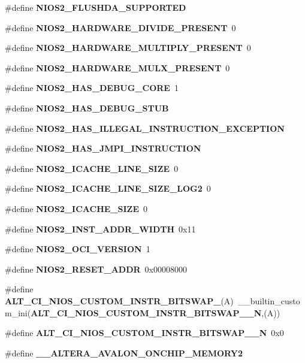 \begin{DoxyCompactItemize}
\#define {\bf N\+I\+O\+S2\+\_\+\+F\+L\+U\+S\+H\+D\+A\+\_\+\+S\+U\+P\+P\+O\+R\+T\+ED}
\item 
\#define {\bf N\+I\+O\+S2\+\_\+\+H\+A\+R\+D\+W\+A\+R\+E\+\_\+\+D\+I\+V\+I\+D\+E\+\_\+\+P\+R\+E\+S\+E\+NT}~0
\item 
\#define {\bf N\+I\+O\+S2\+\_\+\+H\+A\+R\+D\+W\+A\+R\+E\+\_\+\+M\+U\+L\+T\+I\+P\+L\+Y\+\_\+\+P\+R\+E\+S\+E\+NT}~0
\item 
\#define {\bf N\+I\+O\+S2\+\_\+\+H\+A\+R\+D\+W\+A\+R\+E\+\_\+\+M\+U\+L\+X\+\_\+\+P\+R\+E\+S\+E\+NT}~0
\item 
\#define {\bf N\+I\+O\+S2\+\_\+\+H\+A\+S\+\_\+\+D\+E\+B\+U\+G\+\_\+\+C\+O\+RE}~1
\item 
\#define {\bf N\+I\+O\+S2\+\_\+\+H\+A\+S\+\_\+\+D\+E\+B\+U\+G\+\_\+\+S\+T\+UB}
\item 
\#define {\bf N\+I\+O\+S2\+\_\+\+H\+A\+S\+\_\+\+I\+L\+L\+E\+G\+A\+L\+\_\+\+I\+N\+S\+T\+R\+U\+C\+T\+I\+O\+N\+\_\+\+E\+X\+C\+E\+P\+T\+I\+ON}
\item 
\#define {\bf N\+I\+O\+S2\+\_\+\+H\+A\+S\+\_\+\+J\+M\+P\+I\+\_\+\+I\+N\+S\+T\+R\+U\+C\+T\+I\+ON}
\item 
\#define {\bf N\+I\+O\+S2\+\_\+\+I\+C\+A\+C\+H\+E\+\_\+\+L\+I\+N\+E\+\_\+\+S\+I\+ZE}~0
\item 
\#define {\bf N\+I\+O\+S2\+\_\+\+I\+C\+A\+C\+H\+E\+\_\+\+L\+I\+N\+E\+\_\+\+S\+I\+Z\+E\+\_\+\+L\+O\+G2}~0
\item 
\#define {\bf N\+I\+O\+S2\+\_\+\+I\+C\+A\+C\+H\+E\+\_\+\+S\+I\+ZE}~0
\item 
\#define {\bf N\+I\+O\+S2\+\_\+\+I\+N\+S\+T\+\_\+\+A\+D\+D\+R\+\_\+\+W\+I\+D\+TH}~0x11
\item 
\#define {\bf N\+I\+O\+S2\+\_\+\+O\+C\+I\+\_\+\+V\+E\+R\+S\+I\+ON}~1
\item 
\#define {\bf N\+I\+O\+S2\+\_\+\+R\+E\+S\+E\+T\+\_\+\+A\+D\+DR}~0x00008000
\item 
\#define {\bf A\+L\+T\+\_\+\+C\+I\+\_\+\+N\+I\+O\+S\+\_\+\+C\+U\+S\+T\+O\+M\+\_\+\+I\+N\+S\+T\+R\+\_\+\+B\+I\+T\+S\+W\+A\+P\+\_}(A)~\+\_\+\+\_\+builtin\+\_\+custom\+\_\+ini({\bf A\+L\+T\+\_\+\+C\+I\+\_\+\+N\+I\+O\+S\+\_\+\+C\+U\+S\+T\+O\+M\+\_\+\+I\+N\+S\+T\+R\+\_\+\+B\+I\+T\+S\+W\+A\+P\+\_\+\_\+N},(A))
\item 
\#define {\bf A\+L\+T\+\_\+\+C\+I\+\_\+\+N\+I\+O\+S\+\_\+\+C\+U\+S\+T\+O\+M\+\_\+\+I\+N\+S\+T\+R\+\_\+\+B\+I\+T\+S\+W\+A\+P\+\_\+\_\+N}~0x0
\item 
\#define {\bf \+\_\+\+\_\+\+A\+L\+T\+E\+R\+A\+\_\+\+A\+V\+A\+L\+O\+N\+\_\+\+O\+N\+C\+H\+I\+P\+\_\+\+M\+E\+M\+O\+R\+Y2}

\end{DoxyCompactItemize}
